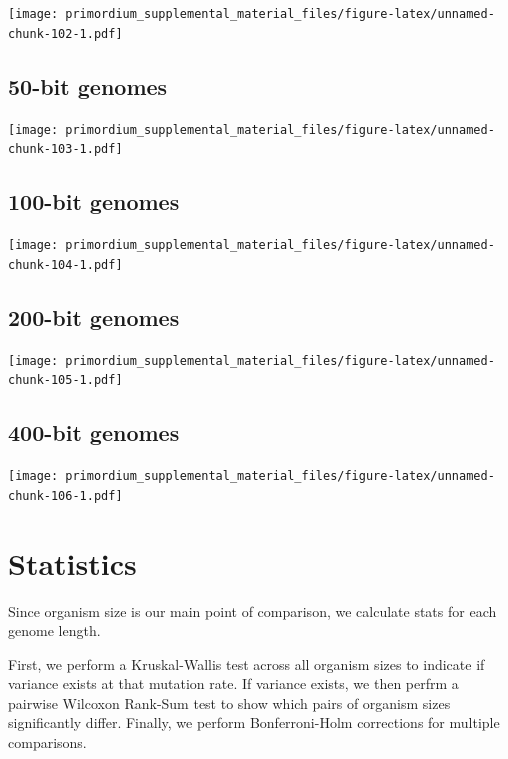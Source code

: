 \documentclass[]{book}
\begin{document}
\texttt{[image: primordium\_supplemental\_material\_files/figure-latex/unnamed-chunk-102-1.pdf]}

\hypertarget{bit-genomes-6}{%
\subsection{50-bit genomes}\label{bit-genomes-6}}

\texttt{[image: primordium\_supplemental\_material\_files/figure-latex/unnamed-chunk-103-1.pdf]}

\hypertarget{bit-genomes-7}{%
\subsection{100-bit genomes}\label{bit-genomes-7}}

\texttt{[image: primordium\_supplemental\_material\_files/figure-latex/unnamed-chunk-104-1.pdf]}

\hypertarget{bit-genomes-8}{%
\subsection{200-bit genomes}\label{bit-genomes-8}}

\texttt{[image: primordium\_supplemental\_material\_files/figure-latex/unnamed-chunk-105-1.pdf]}

\hypertarget{bit-genomes-9}{%
\subsection{400-bit genomes}\label{bit-genomes-9}}

\texttt{[image: primordium\_supplemental\_material\_files/figure-latex/unnamed-chunk-106-1.pdf]}

\hypertarget{statistics-5}{%
\section{Statistics}\label{statistics-5}}

Since organism size is our main point of comparison, we calculate stats for each genome length.

First, we perform a Kruskal-Wallis test across all organism sizes to indicate if variance exists at that mutation rate.
If variance exists, we then perfrm a pairwise Wilcoxon Rank-Sum test to show which pairs of organism sizes significantly differ.
Finally, we perform Bonferroni-Holm corrections for multiple comparisons.
\end{document}
